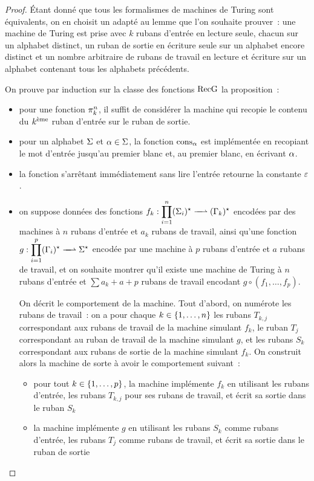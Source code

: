 \begin{proof}
  \'Etant donné que tous les formalismes de machines de Turing sont équivalents,
  on en choisit un adapté au lemme que l'on souhaite prouver~: une machine de
  Turing est prise avec $k$ rubans d'entrée en lecture seule, chacun sur un
  alphabet distinct, un ruban de sortie en écriture seule sur un alphabet encore
  distinct et un nombre arbitraire de rubans de travail en lecture et écriture
  sur un alphabet contenant tous les alphabets précédents.

  On prouve par induction sur la classe des fonctions $\operatorname{RecG}$ la proposition~:
  \begin{itemize}
  \item pour une fonction $\mathop{\pi_{k}^{n}}$, il suffit de considérer la machine qui
    recopie le contenu du $\ordinalnumeralmale{k}$ ruban d'entrée sur le ruban
    de sortie.
  \item pour un alphabet $\Sigma$ et $\alpha \in \Sigma$, la fonction
    $\operatorname{cons}_{\alpha}$
    est implémentée en recopiant le mot d'entrée jusqu'au premier blanc et, au
    premier blanc, en écrivant $\alpha$.
  \item la fonction s'arrêtant immédiatement sans lire l'entrée retourne
    la constante $\varepsilon$.
  \item on suppose données des fonctions
    $\makeFunNamePartial{f_k}{\prod_{i = 1}^n \toStAP{i}}{\toStBP{k}}$ encodées
    par des machines à $n$ rubans d'entrée et $a_k$ rubans de travail, ainsi
    qu'une fonction
    $\makeFunNamePartial{g}{\prod_{i = 1}^p \toStBP{i}}{\toStA}$ encodée par une
    machine à $p$ rubans d'entrée et $a$ rubans de travail, et on souhaite
    montrer qu'il existe une machine de Turing à $n$ rubans d'entrée et
    $\sum a_k + a + p$ rubans de travail encodant $g\circ (f_1,\ldots,f_p)$.

    On décrit le comportement de la machine. Tout d'abord, on numérote les
    rubans de travail~: on a pour chaque $k \in \{1,\ldots,n\}$ les rubans
    $T_{k,j}$ correspondant aux rubans de travail de la machine simulant
    $f_k$, le ruban $T_j$ correspondant au ruban de travail de la machine
    simulant $g$, et les rubans $S_k$ correspondant aux rubans de sortie de
    la machine simulant $f_k$. On construit alors la machine de sorte à avoir
    le comportement suivant~:
    \begin{itemize}
    \item pour tout $k \in \{1,\ldots,p\}$, la machine implémente $f_k$ en
      utilisant les rubans d'entrée, les rubans $T_{k,j}$ pour ses rubans de
      travail, et écrit sa sortie dans le ruban $S_k$
    \item la machine implémente $g$ en utilisant les rubans $S_k$ comme rubans
      d'entrée, les rubans $T_j$ comme rubans de travail, et écrit sa sortie
      dans le ruban de sortie
    \end{itemize}


\end{itemize}
\end{proof}
